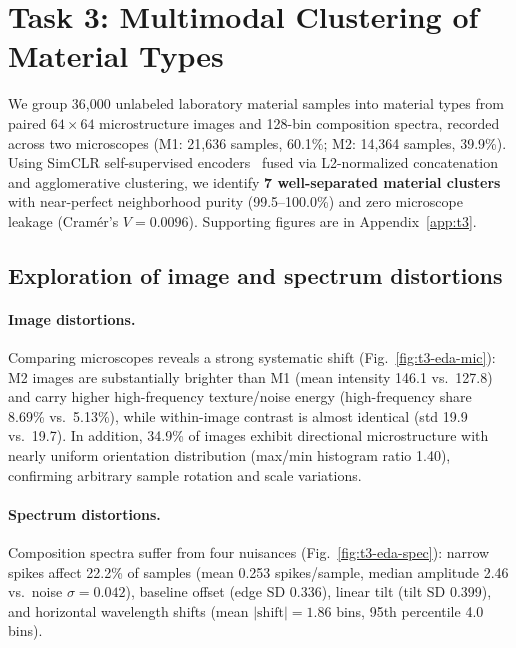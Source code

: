 \section{Task 3: Multimodal Clustering of Material Types}
\label{sec:t3}

We group 36{,}000 unlabeled laboratory material samples into material types from paired
$64 \times 64$ microstructure images and 128-bin composition spectra, recorded across two
microscopes (M1: 21{,}636 samples, 60.1\%; M2: 14{,}364 samples, 39.9\%). Using SimCLR
self-supervised encoders~\cite{chen2020simclr} fused via L2-normalized concatenation and
agglomerative clustering, we identify \textbf{7 well-separated material clusters} with near-perfect
neighborhood purity (99.5--100.0\%) and zero microscope leakage (Cram\'er's $V = 0.0096$).
Supporting figures are in Appendix~\ref{app:t3}.

\subsection{Exploration of image and spectrum distortions}
\label{sec:t3-eda}

\paragraph{Image distortions.} Comparing microscopes reveals a strong systematic shift
(Fig.~\ref{fig:t3-eda-mic}): M2 images are substantially brighter than M1 (mean intensity 146.1 vs.\
127.8) and carry higher high-frequency texture/noise energy (high-frequency share 8.69\% vs.\
5.13\%), while within-image contrast is almost identical (std 19.9 vs.\ 19.7). In addition, 34.9\%
of images exhibit directional microstructure with nearly uniform orientation distribution (max/min
histogram ratio 1.40), confirming arbitrary sample rotation and scale variations.

\paragraph{Spectrum distortions.} Composition spectra suffer from four nuisances
(Fig.~\ref{fig:t3-eda-spec}): narrow spikes affect 22.2\% of samples (mean 0.253 spikes/sample,
median amplitude 2.46 vs.\ noise $\sigma = 0.042$), baseline offset (edge SD 0.336), linear tilt
(tilt SD 0.399), and horizontal wavelength shifts (mean $|\text{shift}| = 1.86$ bins, 95th
percentile 4.0 bins).

